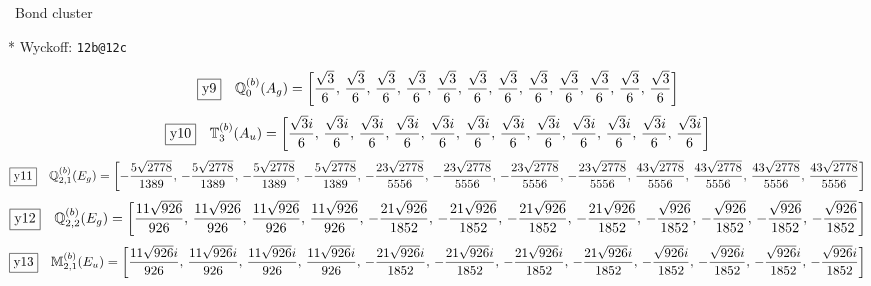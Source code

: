 \documentclass[fleqn,10pt,landscape]{jsarticle}
\begin{document}
\noindent\textbullet\, Bond cluster

\vspace{5mm}

\noindent ** Wyckoff: \texttt{12b@12c}

\begin{dmath*}
\fbox{y9}\quad \mathbb{Q}_{0}^{(b)}(A_{g})=\left[ \frac{\sqrt{3}}{6},\, \frac{\sqrt{3}}{6},\, \frac{\sqrt{3}}{6},\, \frac{\sqrt{3}}{6},\, \frac{\sqrt{3}}{6},\, \frac{\sqrt{3}}{6},\, \frac{\sqrt{3}}{6},\, \frac{\sqrt{3}}{6},\, \frac{\sqrt{3}}{6},\, \frac{\sqrt{3}}{6},\, \frac{\sqrt{3}}{6},\, \frac{\sqrt{3}}{6} \right]
\end{dmath*}
\begin{dmath*}
\fbox{y10}\quad \mathbb{T}_{3}^{(b)}(A_{u})=\left[ \frac{\sqrt{3} i}{6},\, \frac{\sqrt{3} i}{6},\, \frac{\sqrt{3} i}{6},\, \frac{\sqrt{3} i}{6},\, \frac{\sqrt{3} i}{6},\, \frac{\sqrt{3} i}{6},\, \frac{\sqrt{3} i}{6},\, \frac{\sqrt{3} i}{6},\, \frac{\sqrt{3} i}{6},\, \frac{\sqrt{3} i}{6},\, \frac{\sqrt{3} i}{6},\, \frac{\sqrt{3} i}{6} \right]
\end{dmath*}
\begin{dmath*}
\fbox{y11}\quad \mathbb{Q}_{2,1}^{(b)}(E_{g})=\left[ - \frac{5 \sqrt{2778}}{1389},\, - \frac{5 \sqrt{2778}}{1389},\, - \frac{5 \sqrt{2778}}{1389},\, - \frac{5 \sqrt{2778}}{1389},\, - \frac{23 \sqrt{2778}}{5556},\, - \frac{23 \sqrt{2778}}{5556},\, - \frac{23 \sqrt{2778}}{5556},\, - \frac{23 \sqrt{2778}}{5556},\, \frac{43 \sqrt{2778}}{5556},\, \frac{43 \sqrt{2778}}{5556},\, \frac{43 \sqrt{2778}}{5556},\, \frac{43 \sqrt{2778}}{5556} \right]
\end{dmath*}
\begin{dmath*}
\fbox{y12}\quad \mathbb{Q}_{2,2}^{(b)}(E_{g})=\left[ \frac{11 \sqrt{926}}{926},\, \frac{11 \sqrt{926}}{926},\, \frac{11 \sqrt{926}}{926},\, \frac{11 \sqrt{926}}{926},\, - \frac{21 \sqrt{926}}{1852},\, - \frac{21 \sqrt{926}}{1852},\, - \frac{21 \sqrt{926}}{1852},\, - \frac{21 \sqrt{926}}{1852},\, - \frac{\sqrt{926}}{1852},\, - \frac{\sqrt{926}}{1852},\, - \frac{\sqrt{926}}{1852},\, - \frac{\sqrt{926}}{1852} \right]
\end{dmath*}
\begin{dmath*}
\fbox{y13}\quad \mathbb{M}_{2,1}^{(b)}(E_{u})=\left[ \frac{11 \sqrt{926} i}{926},\, \frac{11 \sqrt{926} i}{926},\, \frac{11 \sqrt{926} i}{926},\, \frac{11 \sqrt{926} i}{926},\, - \frac{21 \sqrt{926} i}{1852},\, - \frac{21 \sqrt{926} i}{1852},\, - \frac{21 \sqrt{926} i}{1852},\, - \frac{21 \sqrt{926} i}{1852},\, - \frac{\sqrt{926} i}{1852},\, - \frac{\sqrt{926} i}{1852},\, - \frac{\sqrt{926} i}{1852},\, - \frac{\sqrt{926} i}{1852} \right]
\end{dmath*}
\end{document}
